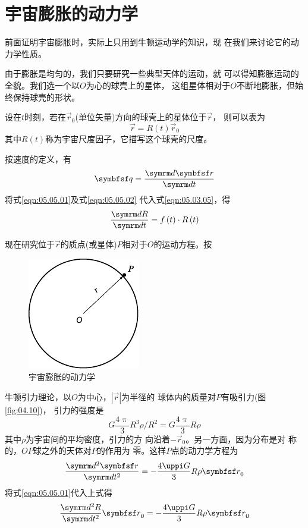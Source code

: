 \section{宇宙膨胀的动力学}\label{sec:05.05}

前面证明宇宙膨胀时，实际上只用到牛顿运动学的知识，现
在我们来讨论它的动力学性质。

由于膨胀是均匀的，我们只要研究一些典型天体的运动，就
可以得知膨胀运动的全貌。我们选一个以$ O $为心的球壳上的星体，
这组星体相对于$ O $不断地膨胀，但始终保持球壳的形状。

设在$ t $时刻，若在$ \vec{r}_0 $(单位矢量)方向的球壳上的星体位于$ \vec{r} $，
则可以表为
\begin{equation}\label{eqn:05.05.01}
  \vec{r} = R \left( t \right) \vec{r} _ { 0 }
\end{equation}
其中$ R\left(t\right) $称为宇宙尺度因子，它描写这个球壳的尺度。

按速度的定义，有
\begin{equation}\label{eqn:05.05.02}
  \vec{q} = \frac { \dif \vec{r} } { \dif t }
\end{equation}
将式\eqref{eqn:05.05.01}及式\eqref{eqn:05.05.02} 代入式\eqref{eqn:05.03.05}，得
\begin{equation}\label{eqn:05.05.03}
  \frac { \dif R } { \dif t } = f \left( t \right) \cdot R \left( t \right)
\end{equation}

现在研究位于$\vec{r}$的质点(或星体)$ P $相对于$ O $的运动方程。按
\begin{figure}
    \centering
    \includegraphics{figure/fig05.04}
    \caption{宇宙膨胀的动力学}
    \label{fig:05.04}
\end{figure}
牛顿引力理论，以$ O $为中心，$ |\vec{r}| $为半径的
球体内的质量对$ P $有吸引力(图\ref{fig:04.10})，
引力的强度是
\begin{equation*}
  G \frac { 4 \uppi } { 3 } R ^ { 3 } \rho / R ^ { 2 } = G \frac { 4 \uppi } { 3 } R \rho
\end{equation*}
其中$ \rho $为宇宙间的平均密度，引力的方
向沿着$ - \vec{r} _ 0 $。另一方面，因为分布是对
称的，$ OP $球之外的天体对$ P $的作用为
零。这样$ P $点的动力学方程为
\begin{equation*}
  \frac { \dif ^ { 2 } \vec{r} } { \dif t ^ { 2 } } = - \frac { 4 \uppi G } { 3 } R \rho \vec{ r } _ 0
\end{equation*}
将式\eqref{eqn:05.05.01}代入上式得
\begin{equation*}
  \frac { \dif ^ { 2 } R } { \dif t ^ { 2 } } \vec{r} _ { 0 } = - \frac { 4 \uppi G } { 3 } R \rho \vec{r} _ 0
\end{equation*}

